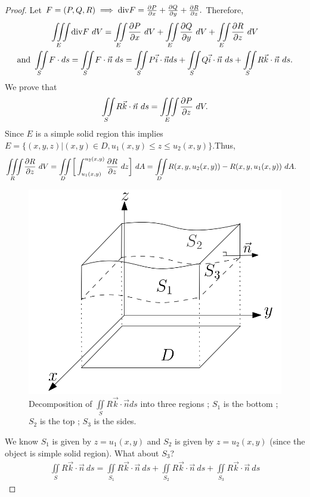 \documentclass[
	12pt,
	]{article}
\theoremstyle{custom}
\theoremstyle{custom}
\theoremstyle{custom}
\theoremstyle{custom}
\theoremstyle{custom}
\theoremstyle{definition}
\theoremstyle{example}
\theoremstyle{note}
\theoremstyle{remark}
\theoremstyle{example}
\numberwithin{equation}{subsection}
\begin{document}
				\begin{proof}
					Let $F = (P,Q,R) \implies \text{div}F = \pdv{P}{x} + \pdv{Q}{y} + \pdv{R}{z}.$ Therefore, 
					\begin{gather*}
						\iiint\limits_{E} \text{div} F \ dV = \iint\limits_{E} \pdv{P}{x} \ dV +\iint\limits_{E} \pdv{Q}{y} \ dV +\iint\limits_{E} \pdv{R}{z} \ dV \\
						\text{and } \iint\limits_{S}F\cdot ds = \iint\limits_{S} F\cdot \vec{n} \ ds = \iint\limits_{S} P \vec{i} \cdot \vec{n} ds+\iint\limits_{S} Q \vec{i} \cdot \vec{n} \ ds + \iint\limits_{S} R\vec{k} \cdot \vec{n} \ ds.  
					\end{gather*}
					We prove that $$\iint\limits_{S} R\vec{k} \cdot \vec{n} \ ds = \iiint\limits_{E} \pdv{P}{z} \ dV. $$
					Since $E$ is a simple solid region this implies $E = \{(x,y,z) | (x,y) \in D , u_{1} (x,y) \le z \le u_{2}(x,y)\}.$Thus, 
					\begin{align*}
						\iiint\limits_{R} \pdv{R}{z} \ dV &= \iint\limits_{D} \bigg[\int_{u_{1}(x,y)}^{u_{2}(x,y)} \pdv{R}{z} (x,y,Z) \ dz\bigg] \ dA = \iint\limits_{D} R(x,y,u_{2}(x,y)) - R(x,y,u_{1}(x,y)) \ dA.
					\end{align*}
					\begin{figure}[H]
						\centering 
						\includegraphics[width= 0.5\linewidth]{MATH314_Notes_Fig12.png}
						\captionsetup{margin=1.5cm, justification = raggedright}
						\caption{Decomposition of $\iint\limits_{S}R\vec{k}\cdot \vec{n} ds$ into three regions ; $S_{1}$ is the bottom ; $S_{2}$ is the top ; $S_{3}$ is the sides.}
					\end{figure}
					We know $S_{1}$ is given by $z = u_{1}(x,y)$ and $S_{2}$ is given by $z= u_{2}(x,y)$ (since the object is simple solid region). What about $S_{3}$?
					\begin{gather*}
						\iint\limits_{S} R \vec{k} \cdot \vec{n} \ ds = \iint\limits_{S_{1}} R \vec{k} \cdot \vec{n} \ ds + \iint\limits_{S_{2}} R \vec{k} \cdot \vec{n} \ ds + \iint\limits_{S_{3}} R \vec{k} \cdot \vec{n} \ ds

\end{gather*}
\end{proof}
\end{document}
